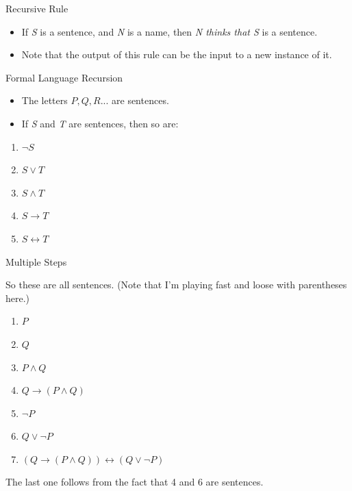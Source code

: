 \documentclass[
  ignorenonframetext,
]{beamer}
\providecommand{\tightlist}{%
  \setlength{\itemsep}{0pt}\setlength{\parskip}{0pt}}
\renewcommand{\,}{\text{, }}
\begin{document}
\begin{frame}{Recursive Rule}
\protect\hypertarget{recursive-rule}{}

\begin{itemize}
\tightlist
\item
  If \emph{S} is a sentence, and \emph{N} is a name, then \emph{N thinks
  that S} is a sentence.
\item
  Note that the output of this rule can be the input to a new instance
  of it.
\end{itemize}

\end{frame}

\begin{frame}{Formal Language Recursion}
\protect\hypertarget{formal-language-recursion}{}

\begin{itemize}
\tightlist
\item
  The letters \(P, Q, R...\) are sentences.
\item
  If \emph{S} and \emph{T} are sentences, then so are:
\end{itemize}

\begin{enumerate}
\tightlist
\item
  \(\neg S\)
\item
  \(S \vee T\)
\item
  \(S \wedge T\)
\item
  \(S \rightarrow T\)
\item
  \(S \leftrightarrow T\)
\end{enumerate}

\end{frame}

\begin{frame}{Multiple Steps}
\protect\hypertarget{multiple-steps}{}

So these are all sentences. (Note that I'm playing fast and loose with
parentheses here.)

\begin{enumerate}
\tightlist
\item
  \(P\)
\item
  \(Q\)
\item
  \(P \wedge Q\)
\item
  \(Q \rightarrow (P \wedge Q)\)
\item
  \(\neg P\)
\item
  \(Q \vee \neg P\)
\item
  \((Q \rightarrow (P \wedge Q)) \leftrightarrow (Q \vee \neg P)\)
\end{enumerate}

The last one follows from the fact that 4 and 6 are sentences.

\end{frame}
\end{document}
